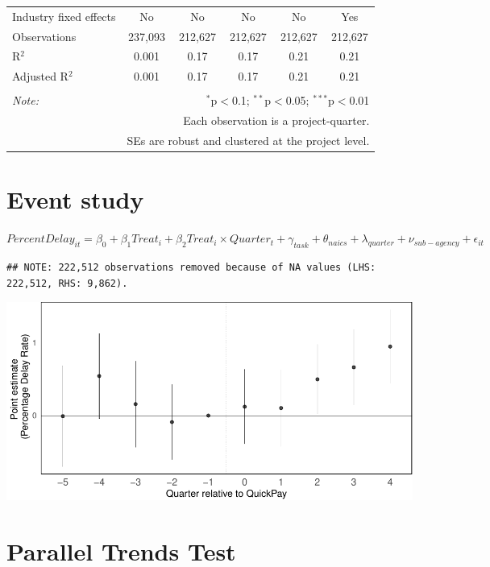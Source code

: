 \documentclass[
]{article}
\begin{document}
\begin{table}[H]
\begin{tabular}{@{\extracolsep{-2pt}}lccccc}
Industry fixed effects & No & No & No & No & Yes \\ 
Observations & 237,093 & 212,627 & 212,627 & 212,627 & 212,627 \\ 
R$^{2}$ & 0.001 & 0.17 & 0.17 & 0.21 & 0.21 \\ 
Adjusted R$^{2}$ & 0.001 & 0.17 & 0.17 & 0.21 & 0.21 \\ 
\hline 
\hline \\[-1.8ex] 
\textit{Note:}  & \multicolumn{5}{r}{$^{*}$p$<$0.1; $^{**}$p$<$0.05; $^{***}$p$<$0.01} \\ 
 & \multicolumn{5}{r}{Each observation is a project-quarter.} \\ 
 & \multicolumn{5}{r}{SEs are robust and clustered at the project level.} \\ 
\end{tabular} 
\end{table}

\hypertarget{event-study}{%
\section{Event study}\label{event-study}}

\(PercentDelay_{it}=\beta_0 + \beta_1 Treat_i + \beta_2 Treat_i \times Quarter_t + \gamma_{task} + \theta_{naics}+\lambda_{quarter}+\nu_{sub-agency}+\epsilon_{it}\)

\begin{verbatim}
## NOTE: 222,512 observations removed because of NA values (LHS: 222,512, RHS: 9,862).
\end{verbatim}

\includegraphics{qp_first_pc_delay_clean_control_files/figure-latex/event_study-1.pdf}

\hypertarget{parallel-trends-test}{%
\section{Parallel Trends Test}\label{parallel-trends-test}}
\end{document}
